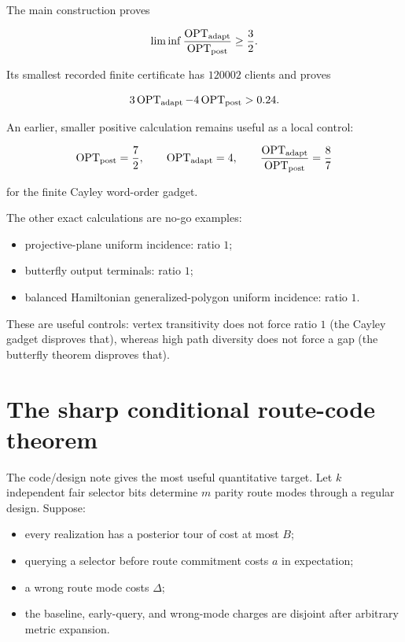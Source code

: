 \documentclass[11pt,a4paper]{article}
\begin{document}
The main construction proves


\[
 \liminf
 \frac{\operatorname{OPT}_{\rm adapt}}
      {\operatorname{OPT}_{\rm post}}\ge\frac32.
\]

Its smallest recorded finite certificate has \(120002\) clients and proves


\[
 3\operatorname{OPT}_{\rm adapt}
 -4\operatorname{OPT}_{\rm post}>0.24.
\]

An earlier, smaller positive calculation remains useful as a local control:


\[
 \operatorname{OPT}_{\rm post}=\frac72,\qquad
 \operatorname{OPT}_{\rm adapt}=4,\qquad
 \frac{\operatorname{OPT}_{\rm adapt}}
      {\operatorname{OPT}_{\rm post}}=\frac87
\]

for the finite Cayley word-order gadget.


The other exact calculations are no-go examples:


\begin{itemize}

\item projective-plane uniform incidence: ratio \(1\);

\item butterfly output terminals: ratio \(1\);

\item balanced Hamiltonian generalized-polygon uniform incidence: ratio \(1\).

\end{itemize}

These are useful controls: vertex transitivity does not force ratio \(1\) (the Cayley gadget disproves that), whereas high path diversity does not force a gap (the butterfly theorem disproves that).


\section*{The sharp conditional route-code theorem}

The code/design note gives the most useful quantitative target.  Let \(k\) independent fair selector bits determine \(m\) parity route modes through a regular design.  Suppose:


\begin{itemize}

\item every realization has a posterior tour of cost at most \(B\);

\item querying a selector before route commitment costs \(a\) in expectation;

\item a wrong route mode costs \(\Delta\);

\item the baseline, early-query, and wrong-mode charges are disjoint after arbitrary metric expansion.

\end{itemize}
\end{document}
